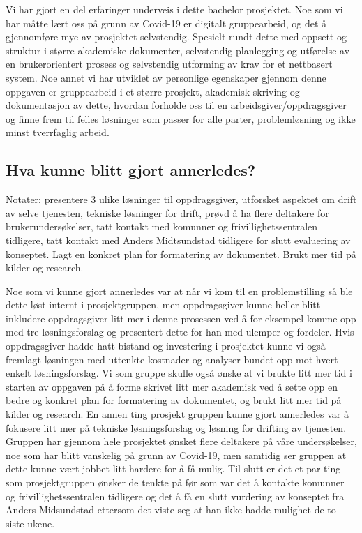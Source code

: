 Vi har gjort en del erfaringer underveis i dette bachelor prosjektet. Noe som vi har måtte lært oss på grunn av Covid-19 er digitalt gruppearbeid, og det å gjennomføre mye av prosjektet selvstendig. Spesielt rundt dette med oppsett og struktur i større akademiske dokumenter, selvstendig planlegging og utførelse av en brukerorientert prosess og selvstendig utforming av krav for et nettbasert system. Noe annet vi har utviklet av personlige egenskaper gjennom denne oppgaven er gruppearbeid i et større prosjekt, akademisk skriving og dokumentasjon av dette, hvordan forholde oss til en arbeidsgiver/oppdragsgiver og finne frem til felles løsninger som passer for alle parter, problemløsning og ikke minst tverrfaglig arbeid.

\subsection{Hva kunne blitt gjort annerledes?}
Notater: presentere 3 ulike løsninger til oppdragsgiver, utforsket aspektet om drift av selve tjenesten, tekniske løsninger for drift, prøvd å ha flere deltakere for brukerundersøkelser, tatt kontakt med komunner og frivillighetssentralen tidligere, tatt kontakt med Anders Midtsundstad tidligere for slutt evaluering av konseptet.
Lagt en konkret plan for formatering av dokumentet.
Brukt mer tid på kilder og research.

Noe som vi kunne gjort annerledes var at når vi kom til en problemstilling så ble dette løst internt i prosjektgruppen, men oppdragsgiver kunne heller blitt inkludere oppdragsgiver litt mer i denne prosessen ved å for eksempel komme opp med tre løsningsforslag og presentert dette for han med ulemper og fordeler. Hvis oppdragsgiver hadde hatt bistand og investering i prosjektet kunne vi også fremlagt løsningen med uttenkte kostnader og analyser bundet opp mot hvert enkelt løsningsforslag. Vi som gruppe skulle også ønske at vi brukte litt mer tid i starten av oppgaven på å forme skrivet litt mer akademisk ved å sette opp en bedre og konkret plan for formatering av dokumentet, og brukt litt mer tid på kilder og research. En annen ting prosjekt gruppen kunne gjort annerledes var å fokusere litt mer på tekniske løsningsforslag og løsning for drifting av tjenesten. Gruppen har gjennom hele prosjektet ønsket flere deltakere på våre undersøkelser, noe som har blitt vanskelig på grunn av Covid-19, men samtidig ser gruppen at dette kunne vært jobbet litt hardere for å få mulig. Til slutt er det et par ting som prosjektgruppen ønsker de tenkte på før som var det å kontakte komunner og frivillighetssentralen tidligere og det å få en slutt vurdering av konseptet fra Anders Midsundstad ettersom det viste seg at han ikke hadde mulighet de to siste ukene. 

